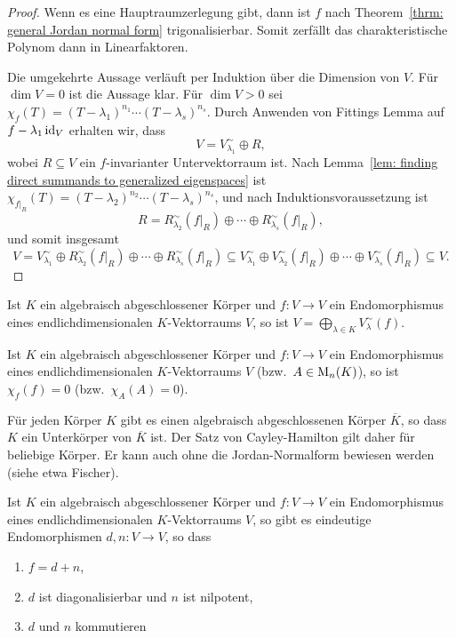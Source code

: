\begin{proof}
  Wenn es eine Hauptraumzerlegung gibt, dann ist $f$ nach Theorem~\ref{thrm: general Jordan normal form} trigonalisierbar.
  Somit zerfällt das charakteristische Polynom dann in Linearfaktoren.
  
  Die umgekehrte Aussage verläuft per Induktion über die Dimension von $V$.
  Für $\dim V = 0$ ist die Aussage klar.
  Für $\dim V > 0$ sei $\chi_f(T) = (T - \lambda_1)^{n_1} \dotsm (T - \lambda_s)^{n_s}$.
  Durch Anwenden von Fittings Lemma auf $f - \lambda_1 \operatorname{id}_V$ erhalten wir, dass
  \[
    V = V^\sim_{\lambda_1} \oplus R,
  \]
  wobei $R \subseteq V$ ein $f$-invarianter Untervektorraum ist.
  Nach Lemma~\ref{lem: finding direct summands to generalized eigenspaces} ist $\chi_{f|_R}(T) = (T - \lambda_2)^{n_2} \dotsm (T - \lambda_s)^{n_s}$, und nach Induktionsvoraussetzung ist
  \[
    R = R^\sim_{\lambda_2}(f|_R) \oplus \dotsb \oplus R^\sim_{\lambda_s}(f|_R),
  \]
  und somit insgesamt
  \[
              V
    =         V^\sim_{\lambda_1} \oplus R^\sim_{\lambda_2}(f|_R) \oplus \dotsb \oplus R^\sim_{\lambda_s}(f|_R)
    \subseteq V^\sim_{\lambda_1} \oplus V^\sim_{\lambda_2}(f|_R) \oplus \dotsb \oplus V^\sim_{\lambda_s}(f|_R)
    \subseteq V.
  \]
\end{proof}


\begin{corollary}
  Ist $K$ ein algebraisch abgeschlossener Körper und $f \colon V \to V$ ein Endomorphismus eines endlichdimensionalen $K$-Vektorraums $V$, so ist $V = \bigoplus_{\lambda \in K} V^\sim_\lambda(f)$.
\end{corollary}


\begin{corollary}
  Ist $K$ ein algebraisch abgeschlossener Körper und $f \colon V \to V$ ein Endomorphismus eines endlichdimensionalen $K$-Vektorraums $V$ (bzw.\ $A \in \mathrm{M}_n(K)$), so ist $\chi_f(f) = 0$ (bzw.\ $\chi_A(A) = 0$).
\end{corollary}


\begin{remark}
  Für jeden Körper $K$ gibt es einen algebraisch abgeschlossenen Körper $\overline{K}$, so dass $K$ ein Unterkörper von $\overline{K}$ ist.
  Der Satz von Cayley-Hamilton gilt daher für beliebige Körper.
  Er kann auch ohne die Jordan-Normalform bewiesen werden (siehe etwa Fischer).
\end{remark}


\begin{corollary}
  Ist $K$ ein algebraisch abgeschlossener Körper und $f \colon V \to V$ ein Endomorphismus eines endlichdimensionalen $K$-Vektorraums $V$, so gibt es eindeutige Endomorphismen $d, n \colon V \to V$, so dass
  \begin{enumerate}[leftmargin=*, label=\alph*)]
    \item
      $f = d + n$,
    \item
      $d$ ist diagonalisierbar und $n$ ist nilpotent,
    \item
      $d$ und $n$ kommutieren
  \end{enumerate}
\end{corollary}


